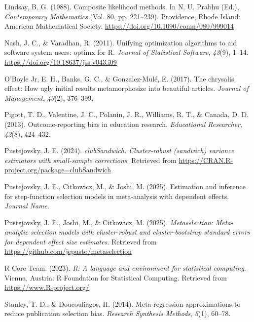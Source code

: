 \documentclass[
  american,
  man, donotrepeattitle,floatsintext]{apa7}
\newlength{\cslhangindent}
\newenvironment{CSLReferences}[2] %
 {\begin{list}{}{%
  \setlength{\itemindent}{0pt}
  \setlength{\leftmargin}{0pt}
  \setlength{\parsep}{0pt}
  \ifodd #1
   \setlength{\leftmargin}{\cslhangindent}
   \setlength{\itemindent}{-1\cslhangindent}
  \fi
  \setlength{\itemsep}{#2\baselineskip}}}
 {\end{list}}
\begin{document}
\begin{CSLReferences}{1}{0}
Lindsay, B. G. (1988). Composite likelihood methods. In N. U. Prabhu (Ed.), \emph{Contemporary {Mathematics}} (Vol. 80, pp. 221--239). Providence, Rhode Island: American Mathematical Society. \url{https://doi.org/10.1090/conm/080/999014}

Nash, J. C., \& Varadhan, R. (2011). Unifying optimization algorithms to aid software system users: {optimx} for {R}. \emph{Journal of Statistical Software}, \emph{43}(9), 1--14. \url{https://doi.org/10.18637/jss.v043.i09}

O'Boyle Jr, E. H., Banks, G. C., \& Gonzalez-Mulé, E. (2017). The chrysalis effect: How ugly initial results metamorphosize into beautiful articles. \emph{Journal of Management}, \emph{43}(2), 376--399.

Pigott, T. D., Valentine, J. C., Polanin, J. R., Williams, R. T., \& Canada, D. D. (2013). Outcome-reporting bias in education research. \emph{Educational Researcher}, \emph{42}(8), 424--432.

Pustejovsky, J. E. (2024). \emph{clubSandwich: Cluster-robust (sandwich) variance estimators with small-sample corrections}. Retrieved from \url{https://CRAN.R-project.org/package=clubSandwich}

Pustejovsky, J. E., Citkowicz, M., \& Joshi, M. (2025). Estimation and inference for step-function selection models in meta-analysis with dependent effects. \emph{Journal Name}.

Pustejovsky, J. E., Joshi, M., \& Citkowicz, M. (2025). \emph{Metaselection: Meta-analytic selection models with cluster-robust and cluster-bootstrap standard errors for dependent effect size estimates}. Retrieved from \url{https://github.com/jepusto/metaselection}

R Core Team. (2023). \emph{R: A language and environment for statistical computing}. Vienna, Austria: R Foundation for Statistical Computing. Retrieved from \url{https://www.R-project.org/}

Stanley, T. D., \& Doucouliagos, H. (2014). Meta-regression approximations to reduce publication selection bias. \emph{Research Synthesis Methods}, \emph{5}(1), 60--78.


\end{CSLReferences}
\end{document}
